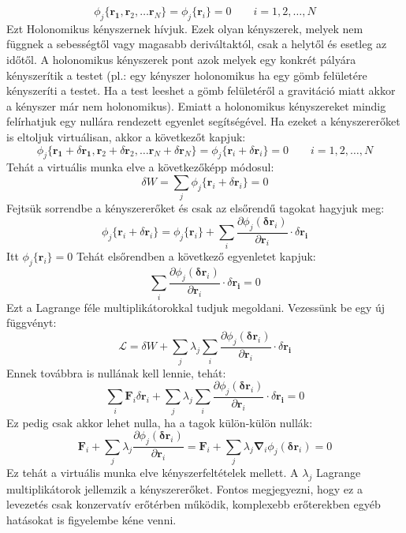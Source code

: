 \documentclass[../main.tex]{subfiles}
\begin{document}
\begin{equation}
    \phi_j \{ \mathbf{r_1}, \mathbf{r}_2, \ldots \mathbf{r}_N\} = \phi_j \{\mathbf{r}_i\} = 0 \qquad i = 1,2,\ldots,N 
\end{equation}
Ezt Holonomikus kényszernek hívjuk. Ezek olyan kényszerek, melyek nem függnek a sebességtől vagy magasabb deriváltaktól, csak a helytől és esetleg az időtől. A holonomikus kényszerek pont azok melyek egy konkrét pályára kényszerítik a testet (pl.: egy kényszer holonomikus ha egy gömb felületére kényszeríti a testet. Ha a test leeshet a gömb felületéről a gravitáció miatt akkor a kényszer már nem holonomikus). Emiatt a holonomikus kényszereket mindig felírhatjuk egy nullára rendezett egyenlet segítségével. Ha ezeket a kényszererőket is eltoljuk virtuálisan, akkor a következőt kapjuk:
\begin{equation}
    \phi_j \{ \mathbf{r_1} + \delta \mathbf{r_1}, \mathbf{r}_2 + \delta \mathbf{r}_2, \ldots \mathbf{r}_N + \delta \mathbf{r}_N\} = \phi_j \{\mathbf{r}_i + \delta \mathbf{r}_i\} = 0 \qquad i = 1,2,\ldots,N
\end{equation}
Tehát a virtuális munka elve a következőképp módosul:
\begin{equation}
    \delta W = \sum_j \phi_j \{\mathbf{r}_i + \delta \mathbf{r}_i\} = 0
\end{equation}
Fejtsük sorrendbe a kényszererőket és csak az elsőrendű tagokat hagyjuk meg:
\begin{equation}
    \phi_j \{\mathbf{r}_i + \delta \mathbf{r}_i\} = \phi_j \{\mathbf{r}_i\} + \sum_i \frac{\partial \phi_j(\mathbf{\delta r}_i)}{\partial \mathbf{r}_i} \cdot \delta \mathbf{r_i}
\end{equation}
Itt $\phi_j \{\mathbf{r}_i\} = 0$ Tehát elsőrendben a következő egyenletet kapjuk:
\begin{equation}
    \sum_i \frac{\partial \phi_j(\mathbf{\delta r}_i)}{\partial \mathbf{r}_i} \cdot \delta \mathbf{r_i} = 0
\end{equation}
Ezt a Lagrange féle multiplikátorokkal tudjuk megoldani. Vezessünk be egy új függvényt:
\begin{equation}
    \mathcal{L} = \delta W + \sum_j \lambda_j \sum_i \frac{\partial \phi_j(\mathbf{\delta r}_i)}{\partial \mathbf{r}_i} \cdot \delta \mathbf{r_i}
\end{equation}
Ennek továbbra is nullának kell lennie, tehát:
\begin{equation}
    \sum_i \mathbf{F}_i \delta \mathbf{r}_i + \sum_j \lambda_j \sum_i \frac{\partial \phi_j(\mathbf{\delta r}_i)}{\partial \mathbf{r}_i} \cdot \delta \mathbf{r_i} = 0
\end{equation}
Ez pedig csak akkor lehet nulla, ha a tagok külön-külön nullák:
 \begin{equation}
     \mathbf{F}_i + \sum_j \lambda_j \frac{\partial \phi_j(\mathbf{\delta r}_i)}{\partial \mathbf{r}_i} = \mathbf{F}_i + \sum_j \lambda_j \boldsymbol{\nabla}_i \phi_j(\mathbf{\delta r}_i) = 0
 \end{equation}
Ez tehát a virtuális munka elve kényszerfeltételek mellett. A $\lambda_j$ Lagrange multiplikátorok jellemzik a kényszererőket. Fontos megjegyezni, hogy ez a levezetés csak konzervatív erőtérben működik, komplexebb erőterekben egyéb hatásokat is figyelembe kéne venni.
\end{document}
